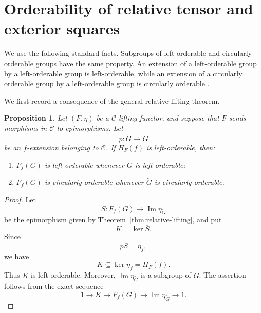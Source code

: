 \documentclass[10pt]{amsart}
\newtheorem{proposition}[theorem]{Proposition}
\renewcommand{\*}{\cdot {\dots} \cdot}
\newcommand{\?}[1]{\overset{?}{#1}}
\numberwithin{equation}{section}
\begin{document}
\section{Orderability of relative tensor and exterior squares}
\label{sec:orderability}

We use the following standard facts. Subgroups of left-orderable
and circularly orderable groups have the same property. An
extension of a left-orderable group by a left-orderable group is
left-orderable, while an extension of a circularly orderable group
by a left-orderable group is circularly orderable
\cite{ClayGhaswala2021}.

We first record a consequence of the general relative lifting
theorem.

\begin{proposition}\label{prop:relative-orderability}
Let $(F,\eta)$ be a $\mathcal C$-lifting functor, and suppose
that $F$ sends morphisms in $\mathcal C$ to epimorphisms. Let
\[
p\colon\widetilde G\longrightarrow G
\]
be an $f$-extension belonging to $\mathcal C$. If $H_F(f)$ is
left-orderable, then:
\begin{enumerate}
\item $F_f(G)$ is left-orderable whenever $\widetilde G$ is
      left-orderable;

\item $F_f(G)$ is circularly orderable whenever $\widetilde G$
      is circularly orderable.
\end{enumerate}
\end{proposition}

\begin{proof}
Let
\[
\overline S\colon F_f(G)\longrightarrow
\operatorname{Im}\eta_{\widetilde G}
\]
be the epimorphism given by
Theorem~\ref{thm:relative-lifting}, and put
\[
K=\ker\overline S.
\]
Since
\[
p\overline S=\eta_f,
\]
we have
\[
K\subseteq\ker\eta_f=H_F(f).
\]
Thus $K$ is left-orderable. Moreover,
$\operatorname{Im}\eta_{\widetilde G}$ is a subgroup of
$\widetilde G$. The assertion follows from the exact sequence
\[
1\longrightarrow K\longrightarrow F_f(G)
\longrightarrow\operatorname{Im}\eta_{\widetilde G}
\longrightarrow1.
\]
\end{proof}
\end{document}
